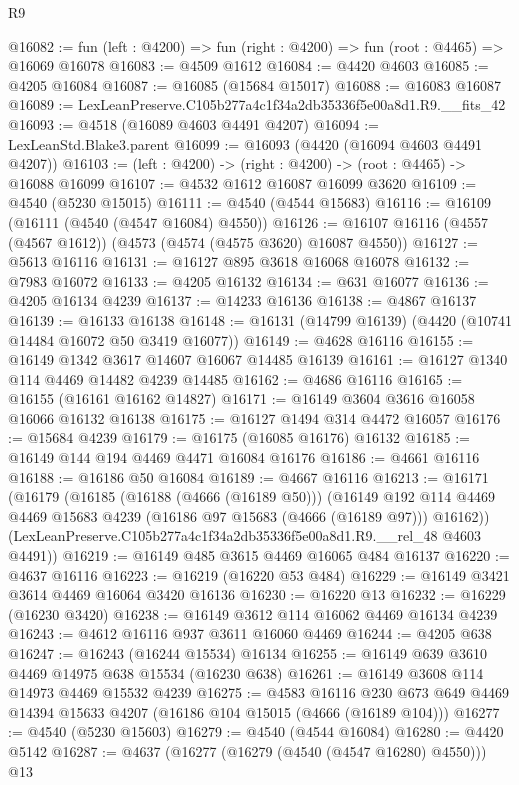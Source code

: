 \begin{lexlean}{R9}
\begin{coremodule}
@16082 := fun (left : @4200) => fun (right : @4200) => fun (root : @4465) => @16069 @16078
@16083 := @4509 @1612
@16084 := @4420 @4603
@16085 := @4205 @16084
@16087 := @16085 (@15684 @15017)
@16088 := @16083 @16087
@16089 := LexLeanPreserve.C105b277a4c1f34a2db35336f5e00a8d1.R9.__fits_42
@16093 := @4518 (@16089 @4603 @4491 @4207)
@16094 := LexLeanStd.Blake3.parent
@16099 := @16093 (@4420 (@16094 @4603 @4491 @4207))
@16103 := (left : @4200) -> (right : @4200) -> (root : @4465) -> @16088 @16099
@16107 := @4532 @1612 @16087 @16099 @3620
@16109 := @4540 (@5230 @15015)
@16111 := @4540 (@4544 @15683)
@16116 := @16109 (@16111 (@4540 (@4547 @16084) @4550))
@16126 := @16107 @16116 (@4557 (@4567 @1612)) (@4573 (@4574 (@4575 @3620) @16087 @4550))
@16127 := @5613 @16116
@16131 := @16127 @895 @3618 @16068 @16078
@16132 := @7983 @16072
@16133 := @4205 @16132
@16134 := @631 @16077
@16136 := @4205 @16134 @4239
@16137 := @14233 @16136
@16138 := @4867 @16137
@16139 := @16133 @16138
@16148 := @16131 (@14799 @16139) (@4420 (@10741 @14484 @16072 @50 @3419 @16077))
@16149 := @4628 @16116
@16155 := @16149 @1342 @3617 @14607 @16067 @14485 @16139
@16161 := @16127 @1340 @114 @4469 @14482 @4239 @14485
@16162 := @4686 @16116
@16165 := @16155 (@16161 @16162 @14827)
@16171 := @16149 @3604 @3616 @16058 @16066 @16132 @16138
@16175 := @16127 @1494 @314 @4472 @16057
@16176 := @15684 @4239
@16179 := @16175 (@16085 @16176) @16132
@16185 := @16149 @144 @194 @4469 @4471 @16084 @16176
@16186 := @4661 @16116
@16188 := @16186 @50 @16084
@16189 := @4667 @16116
@16213 := @16171
    (@16179
      (@16185
        (@16188 (@4666 (@16189 @50)))
        (@16149 @192 @114 @4469 @4469 @15683 @4239 (@16186 @97 @15683 (@4666 (@16189 @97))) @16162))
      (LexLeanPreserve.C105b277a4c1f34a2db35336f5e00a8d1.R9.__rel_48 @4603 @4491))
@16219 := @16149 @485 @3615 @4469 @16065 @484 @16137
@16220 := @4637 @16116
@16223 := @16219 (@16220 @53 @484)
@16229 := @16149 @3421 @3614 @4469 @16064 @3420 @16136
@16230 := @16220 @13
@16232 := @16229 (@16230 @3420)
@16238 := @16149 @3612 @114 @16062 @4469 @16134 @4239
@16243 := @4612 @16116 @937 @3611 @16060 @4469
@16244 := @4205 @638
@16247 := @16243 (@16244 @15534) @16134
@16255 := @16149 @639 @3610 @4469 @14975 @638 @15534 (@16230 @638)
@16261 := @16149 @3608 @114 @14973 @4469 @15532 @4239
@16275 := @4583
    @16116
    @230
    @673
    @649
    @4469
    @14394
    @15633
    @4207
    (@16186 @104 @15015 (@4666 (@16189 @104)))
@16277 := @4540 (@5230 @15603)
@16279 := @4540 (@4544 @16084)
@16280 := @4420 @5142
@16287 := @4637 (@16277 (@16279 (@4540 (@4547 @16280) @4550))) @13

\end{coremodule}
\end{lexlean}
